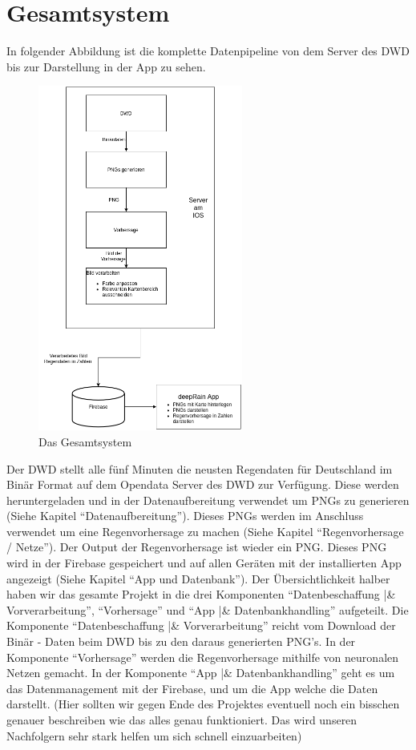 \section{Gesamtsystem}\label{gesamtsystem}
In folgender Abbildung ist die komplette Datenpipeline von dem Server des DWD bis zur Darstellung in der App zu sehen.  

\begin{figure}[htb]
 \centering
 \includegraphics[width=0.6\textwidth,angle=0]{abb/Gesamtsystem}
 \caption[Das Gesamtsystem]{Das Gesamtsystem}
\label{fig:Beschreibung}
\end{figure}

Der DWD stellt alle fünf Minuten die neusten Regendaten für Deutschland im Binär Format auf dem Opendata Server des DWD zur Verfügung. 
Diese werden heruntergeladen und in der Datenaufbereitung verwendet um PNGs zu generieren (Siehe Kapitel “Datenaufbereitung”). 
Dieses PNGs werden im Anschluss verwendet um eine Regenvorhersage zu machen (Siehe Kapitel “Regenvorhersage / Netze”). 
Der Output der Regenvorhersage ist wieder ein PNG. 
Dieses PNG wird in der Firebase gespeichert und auf allen Geräten mit der installierten App angezeigt (Siehe Kapitel “App und Datenbank”). 
Der Übersichtlichkeit halber haben wir das gesamte Projekt in die drei Komponenten “Datenbeschaffung |\& Vorverarbeitung”, “Vorhersage” und 
“App |\& Datenbankhandling” aufgeteilt.  
Die Komponente “Datenbeschaffung |\& Vorverarbeitung” reicht vom Download der Binär - Daten beim DWD bis zu den daraus generierten PNG’s. 
In der Komponente “Vorhersage” werden die Regenvorhersage mithilfe von neuronalen Netzen gemacht. In der Komponente “App |\& Datenbankhandling” 
geht es um das Datenmanagement mit der Firebase, und um die App welche die Daten darstellt.  
(Hier sollten wir gegen Ende des Projektes eventuell noch ein bisschen genauer beschreiben wie das alles genau funktioniert. 
Das wird unseren Nachfolgern sehr stark helfen um sich schnell einzuarbeiten)  